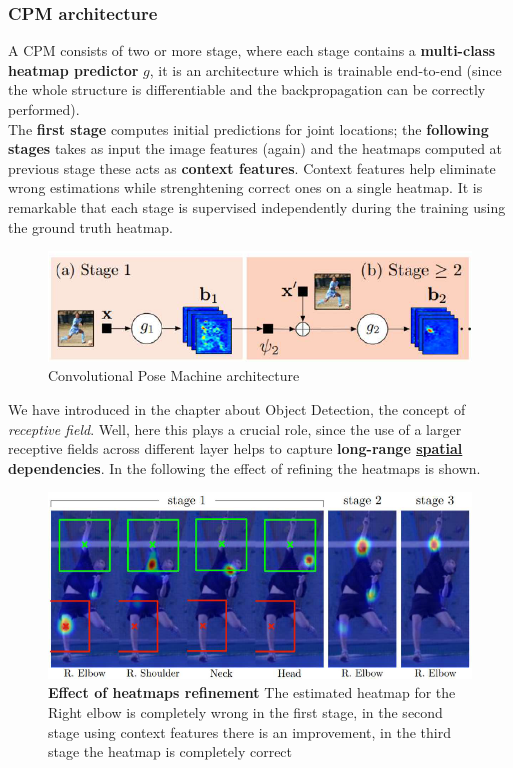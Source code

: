 \subsubsection{CPM architecture}
A CPM consists of two or more stage, where each stage contains a \textbf{multi-class heatmap predictor} $g$, it is an architecture which is trainable end-to-end (since the whole structure is differentiable and the backpropagation can be correctly performed).\\
The \textbf{first stage} computes initial predictions for joint locations; the \textbf{following stages} takes as input the image features (again) and the heatmaps computed at previous stage these acts as \textbf{context features}. Context features help eliminate wrong estimations while strenghtening correct ones on a single heatmap. It is remarkable that each stage is supervised independently during the training using the ground truth heatmap.

\begin{figure}[h]
    \centering
    \includegraphics[scale=1]{img/CMP_arch.png}
    \caption{Convolutional Pose Machine architecture}
\end{figure}

We have introduced in the chapter about Object Detection, the concept of \textit{receptive field}. Well, here this plays  a crucial role, since the use of a larger receptive fields across different layer helps to capture \textbf{long-range \underline{spatial} dependencies}. In the following the effect of refining the heatmaps is shown.

\begin{figure}[h]
    \centering
    \includegraphics[scale=0.8]{img/CPM_2.png}
    \caption{\textbf{Effect of heatmaps refinement} The estimated heatmap for the Right elbow is completely wrong in the first stage, in the second stage using context features there is an improvement, in the third stage the heatmap is completely correct}    
\end{figure}


